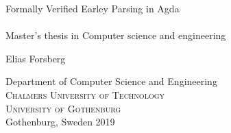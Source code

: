 

\newcommand{\me}{Elias Forsberg}
\newcommand{\titleA}{Formally Verified Earley Parsing in Agda}
\newcommand{\titleB}{~}

\begin{titlepage}

\addtolength{\voffset}{2cm}

\begin{figure}[H]
\centering
\vspace{1cm}	%
\end{figure}

\mbox{}
\vfill
\renewcommand{\familydefault}{\sfdefault} \normalfont %
{\Huge 	\titleA	%
		} 	\\[0.5cm]
{\Large \titleB}\\[0.5cm]
Master's thesis in Computer science and engineering \vspace{1cm}

{\Large \me} \vspace{2.9cm}

Department of Computer Science and Engineering \\
\textsc{Chalmers University of Technology} \\
\textsc{University of Gothenburg} \\
Gothenburg, Sweden 2019

\renewcommand{\familydefault}{\rmdefault} \normalfont %
\end{titlepage}


\newpage
\restoregeometry
\thispagestyle{empty}
\mbox{}


